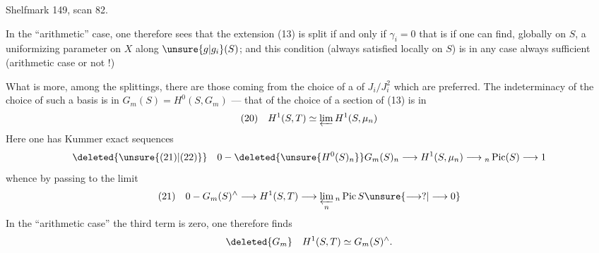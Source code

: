 Shelfmark 149, scan 82.

In the ``arithmetic'' case, one therefore sees that the extension (13) is split if and only if $\gamma_i=0$ that is if one can find, globally on $S$, a uniformizing parameter on $X$ along $\unsure{g|g_i}(S)$; and this condition (always satisfied locally on $S$) is in any case always sufficient (arithmetic case or not !)

What is more, among the splittings, there are those coming from the choice of a  of $J_i/J_i^2$ which are preferred. The indeterminacy of the choice of such a basis is in $G_m(S)=H^0(S,G_m)$ --- that of the choice of a section of (13) is in
\[
(20)\quad H^1(S,T)\simeq\varprojlim H^1(S,\mu_n)
\]
Here one has Kummer exact sequences
\[
\deleted{\unsure{(21)|(22)}}\quad 0-\deleted{\unsure{H^0(S)_n}}G_m(S)_n\longrightarrow H^1(S,\mu_n)\longrightarrow{}_n\operatorname{Pic}(S)\longrightarrow1
\]
whence by passing to the limit
\[
(21)\quad 0-G_m(S)^\wedge\longrightarrow H^1(S,T)\longrightarrow\varprojlim_n{}_n\operatorname{Pic}S\unsure{\longrightarrow?|\longrightarrow0}
\]
In the ``arithmetic case'' the third term is zero, one therefore finds
\[
\deleted{G_m}\quad H^1(S,T)\simeq G_m(S)^\wedge.
\]
